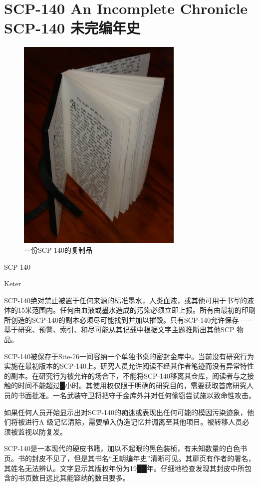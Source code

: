 \chapter[SCP-140 未完编年史]{
    SCP-140 An Incomplete Chronicle\\
    SCP-140 未完编年史
}

\label{chap:SCP-140}

\begin{figure}[H]
    \centering
    \includegraphics[width=0.5\linewidth]{images/SCP-140.jpg}
    \caption*{一份SCP-140的复制品}
\end{figure}

SCP-140

Keter

SCP-140绝对禁止被置于任何来源的标准墨水，人类血液，或其他可用于书写的液体的15米范围内。任何由血液或墨水造成的污染必须立即上报。所有由最初的印刷所创造的SCP-140的副本必须尽可能找到并加以摧毁。只有SCP-140允许保存——基于研究、预警、索引、和尽可能从其记载中根据文字主题推断出其他SCP 物品。

SCP-140被保存于Site-76一间容纳一个单独书桌的密封金库中。当前没有研究行为实施在最初版本的SCP-140上。研究人员允许阅读不经其作者笔迹而没有异常特性的副本。在研究行为被允许的场合下，不能将SCP-140移离其仓库，阅读者与之接触的时间不能超过█小时。其使用权仅限于明确的研究目的，需要获取首席研究人员的书面批准。一名武装守卫将把守于金库外并对任何偷窃尝试施以致命性攻击。

如果任何人员开始显示出对SCP-140的痴迷或表现出任何可能的模因污染迹象，他们将被进行A 级记忆清除，需要植入伪造记忆并调离至其他项目。被转移人员必须被监视以防复发。

SCP-140是一本现代的硬皮书籍，加以不起眼的黑色装桢，有未知数量的白色书页。书的封皮不见了，但是其书名“王朝编年史”清晰可见。其扉页有作者的署名，其姓名无法辨认。文字显示其版权年份为19██年。仔细地检查发现其封皮中所包含的书页数目远比其能容纳的数目要多。

